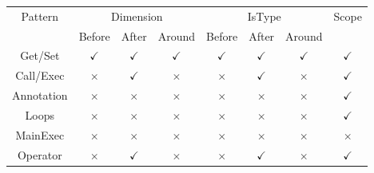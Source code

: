 \begin{table}[]
\centering
\begin{tabular}{c|ccc|ccc|c}
\multirow{2}{*}{Pattern} & \multicolumn{3}{c|}{Dimension}             & \multicolumn{3}{c|}{IsType}                & \multirow{2}{*}{Scope} \\
                         & Before       & After        & Around       & Before       & After        & Around       &                        \\ \hline
Get/Set                  & $\checkmark$ & $\checkmark$ & $\checkmark$ & $\checkmark$ & $\checkmark$ & $\checkmark$ & $\checkmark$           \\
Call/Exec                & $\times$     & $\checkmark$ & $\times$     & $\times$     & $\checkmark$ & $\times$     & $\checkmark$           \\
Annotation               & $\times$     & $\times$     & $\times$     & $\times$     & $\times$     & $\times$     & $\checkmark$           \\
Loops                    & $\times$     & $\times$     & $\times$     & $\times$     & $\times$     & $\times$     & $\checkmark$           \\
MainExec                 & $\times$     & $\times$     & $\times$     & $\times$     & $\times$     & $\times$     & $\times$               \\
Operator                 & $\times$     & $\checkmark$ & $\times$     & $\times$     & $\checkmark$ & $\times$     & $\checkmark$          
\end{tabular}
\end{table}